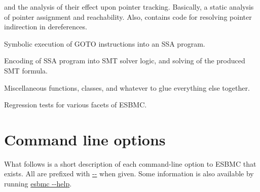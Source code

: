 \documentclass{article}
\begin{document}
\begin{description}
                        and the analysis of their effect upon pointer tracking.
                        Basically, a static analysis of pointer assignment and
                        reachability. Also, contains code for resolving pointer
                        indirection in dereferences.
\item[goto-symex] Symbolic execution of GOTO instructions into an SSA program.
\item[solvers] Encoding of SSA program into SMT solver logic, and solving of
               the produced SMT formula.
\item[util] Miscellaneous functions, classes, and whatever to glue everything
            else together.
\item[regression] Regression tests for various facets of ESBMC.
\end{description}

\section{Command line options}

What follows is a short description of each command-line option to ESBMC that
exists. All are prefixed with \url{--} when given. Some information is also
available by running \url{esbmc --help}.
\end{document}
